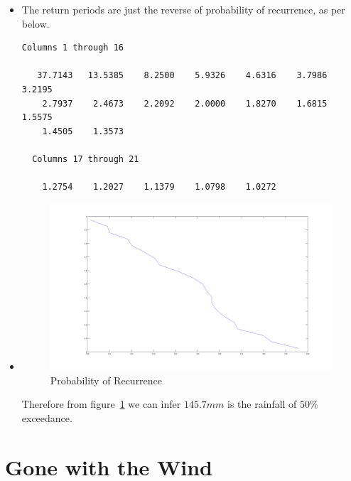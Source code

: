 \documentclass[12pt]{article}
\begin{document}
\begin{itemize}
\begin{verbatim}
  Columns 1 through 16

    0.0265    0.0739    0.1212    0.1686    0.2159    0.2633    0.3106
    0.3580    0.4053    0.4527    0.5000    0.5473    0.5947    0.6420
    0.6894    0.7367

  Columns 17 through 21

    0.7841    0.8314    0.8788    0.9261    0.9735

\end{verbatim}
\item The return periods are just the reverse of probability of
  recurrence, as per below.
\begin{verbatim}
Columns 1 through 16

   37.7143   13.5385    8.2500    5.9326    4.6316    3.7986    3.2195
    2.7937    2.4673    2.2092    2.0000    1.8270    1.6815    1.5575
    1.4505    1.3573

  Columns 17 through 21

    1.2754    1.2027    1.1379    1.0798    1.0272
\end{verbatim}
\item 
  \begin{figure}
    \centering
    \includegraphics[angle=90,scale=0.4]{rain2}
    \caption{Probability of Recurrence}
    \label{fig:prob-recur}
  \end{figure}
  Therefore from figure~\ref{fig:prob-recur} we can infer $145.7mm$ is
  the rainfall of $50\%$ exceedance.
\end{itemize}

\section{Gone with the Wind}
\label{sec:it-there.-air}
\end{document}
